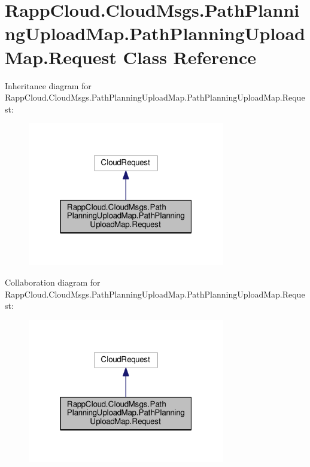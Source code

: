 \hypertarget{classRappCloud_1_1CloudMsgs_1_1PathPlanningUploadMap_1_1PathPlanningUploadMap_1_1Request}{\section{Rapp\-Cloud.\-Cloud\-Msgs.\-Path\-Planning\-Upload\-Map.\-Path\-Planning\-Upload\-Map.\-Request Class Reference}
\label{classRappCloud_1_1CloudMsgs_1_1PathPlanningUploadMap_1_1PathPlanningUploadMap_1_1Request}
}


Inheritance diagram for Rapp\-Cloud.\-Cloud\-Msgs.\-Path\-Planning\-Upload\-Map.\-Path\-Planning\-Upload\-Map.\-Request\-:
\nopagebreak
\begin{figure}[H]
\begin{center}
\leavevmode
\includegraphics[width=244pt]{classRappCloud_1_1CloudMsgs_1_1PathPlanningUploadMap_1_1PathPlanningUploadMap_1_1Request__inherit__graph}
\end{center}
\end{figure}


Collaboration diagram for Rapp\-Cloud.\-Cloud\-Msgs.\-Path\-Planning\-Upload\-Map.\-Path\-Planning\-Upload\-Map.\-Request\-:
\nopagebreak
\begin{figure}[H]
\begin{center}
\leavevmode
\includegraphics[width=244pt]{classRappCloud_1_1CloudMsgs_1_1PathPlanningUploadMap_1_1PathPlanningUploadMap_1_1Request__coll__graph}
\end{center}
\end{figure}
